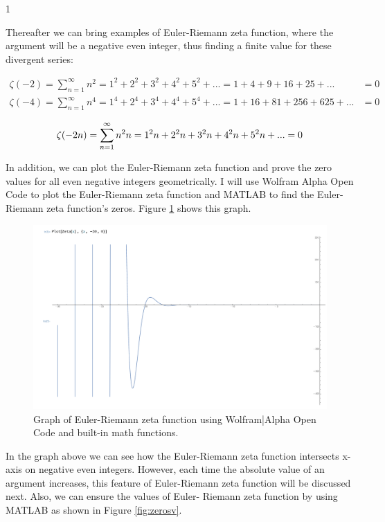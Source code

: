 1\documentclass[a4paper]{article}
\begin{document}
Thereafter we can bring examples of Euler-Riemann zeta function, where the argument will be a
negative even integer, thus finding a finite value for these divergent series:

\begin{align*}
  \zeta(-2)=\sum_{n=1}^{\infty} n^2=1^2+2^2+3^2+4^2+5^2+...=1+4+9+16+25+...&=0\\
  \zeta(-4)=\sum_{n=1}^{\infty} n^4=1^4+2^4+3^4+4^4+5^4+...=1+16+81+256+625+...&=0
\end{align*}

\begin{equation}
\zeta(-2n)=\sum_{n=1}^{\infty} n^2n=1^2n+2^2n+3^2n+4^2n+5^2n+...=0\\  
  \end{equation}

In addition, we can plot the Euler-Riemann zeta function and prove the zero values for all even
negative integers geometrically. I will use Wolfram Alpha Open Code to plot the Euler-Riemann
zeta function and MATLAB to find the Euler-Riemann zeta function's zeros. Figure \ref{fig:zeros} shows this graph.

\begin{figure}[h!]
  \includegraphics[width=\textwidth]{zeros.png}
  \begin{center}
  \caption{Graph of Euler-Riemann zeta function using
Wolfram|Alpha Open Code and built-in math functions.}
    \label{fig:zeros}
  \end{center}
  \end{figure}

In the graph above we can see how the Euler-Riemann zeta function intersects x-axis on negative
even integers. However, each time the absolute value of an argument increases, this feature of
Euler-Riemann zeta function will be discussed next. Also, we can ensure the values of Euler-
Riemann zeta function by using MATLAB as shown in Figure \ref{fig:zerosv}.
\end{document}
